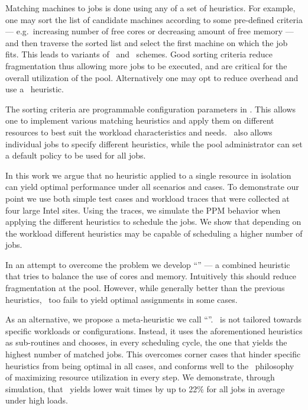 Matching machines to jobs is done using any of a set of heuristics.
For example, one may sort the list of candidate machines according to
some pre-defined criteria --- e.g.\ increasing number of free cores or
decreasing amount of free memory --- and then traverse the sorted list
and select the first machine on which the job fits.
This leads to variants of \bef\ and \wof\ schemes.
Good sorting criteria reduce fragmentation thus allowing more jobs to be
executed, and are critical for the overall utilization of the pool.
Alternatively one may opt to reduce overhead and use a
\fif\ heuristic.

The sorting criteria are programmable configuration parameters in \nb.
This allows one to implement various matching heuristics and apply
them on different resources to best suit the workload characteristics
and needs.
\nb\ also allows individual jobs to specify different heuristics,
while the pool administrator can set a default policy to be used for
all jobs.

In this work we argue that no heuristic applied to a
single resource in isolation can yield optimal performance under all
scenarios and cases.
To demonstrate our point we use both simple test cases and workload
traces that were collected at four large Intel sites.
Using the traces, we simulate the PPM behavior when applying the
different heuristics to schedule the jobs.
We show that depending on the workload different heuristics may be
capable of scheduling a higher number of jobs.

In an attempt to overcome the problem we develop ``\mif'' --- a
combined heuristic that tries to balance the use of cores and memory.
Intuitively this should reduce fragmentation at the pool.
However, while generally better than the previous heuristics,
\mif\ too fails to yield optimal assignments in some cases.

As an alternative, we propose a meta-heuristic we call ``\maj''.
\maj\ is not tailored towards specific workloads or configurations.
Instead, it uses the aforementioned heuristics as sub-routines and
chooses, in every scheduling cycle, the one that yields the highest
number of matched jobs.
This overcomes corner cases that hinder specific heuristics from being
optimal in all cases, and conforms well to the \nb\ philosophy of
maximizing resource utilization in every step.
We demonstrate, through simulation, that \maj\ yields lower wait times
by up to 22\% for all jobs in average under high loads.

